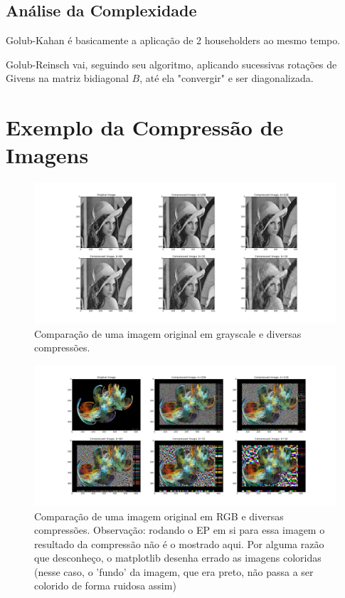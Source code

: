 \subsection{Análise da Complexidade}
Golub-Kahan é basicamente a aplicação de 2 householders ao mesmo tempo.

Golub-Reinsch vai, seguindo seu algoritmo, aplicando sucessivas rotações de Givens na matriz bidiagonal $B$, até ela
"convergir" e ser diagonalizada.

\section{Exemplo da Compressão de Imagens}
\begin{figure}[htb]
    \centering
    \includegraphics[width=1.0\textwidth]{grayscaleTest.png}
    \caption{Comparação de uma imagem original em grayscale e diversas compressões.}
    \label{fig:ex_gray}
\end{figure}

\begin{figure}[htb]
    \centering
    \includegraphics[width=1.0\textwidth]{rgbTest.png}
    \caption{Comparação de uma imagem original em RGB e diversas compressões. Observação: rodando o EP em si para essa 
            imagem o resultado da compressão não é o mostrado aqui. Por alguma razão que desconheço, o matplotlib desenha
            errado as imagens coloridas (nesse caso, o 'fundo' da imagem, que era preto, não passa a ser colorido de forma
            ruidosa assim)}
    \label{fig:ex_rgb}
\end{figure}




